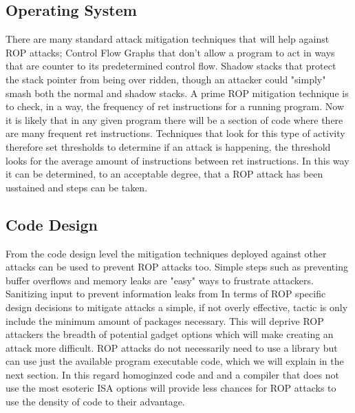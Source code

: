 \documentclass[11pt]{amsart}
\begin{document}
\subsection*{Operating System}
There are many standard attack mitigation techniques that will help against ROP attacks; Control Flow Graphs that don't allow a program to act in ways that are counter to its predetermined control flow.  Shadow stacks that protect the stack pointer from being over ridden, though an attacker could "simply" smash both the normal and shadow stacks.  
A prime ROP mitigation technique is to check, in a way, the frequency of ret instructions for a running program.  Now it is likely that in any given program there will be a section of code where there are many frequent ret instructions.  Techniques that look for this type of activity therefore set thresholds to determine if an attack is happening, the threshold looks for the average amount of instructions between ret instructions.  In this way it can be determined, to an acceptable degree, that a ROP attack has been usstained and steps can be taken.
\subsection*{Code Design}
From the code design level the mitigation techniques deployed against other attacks can be used to prevent ROP attacks too. Simple steps such as preventing buffer overflows and memory leaks are "easy" ways to frustrate attackers.  Sanitizing input to prevent information leaks from %
In terms of ROP specific design decisions to mitigate attacks a simple, if not overly effective, tactic is only include the minimum amount of packages necessary.  This will deprive ROP attackers the breadth of potential gadget options which will make creating an attack more difficult.  ROP attacks do not necessarily need to use a library but can use just the available program executable code, which we will explain in the next section.  In this regard homoginzed code and and a compiler that does not use the most esoteric ISA options will provide less chances for ROP attacks to use the density of code to their advantage.
\end{document}
